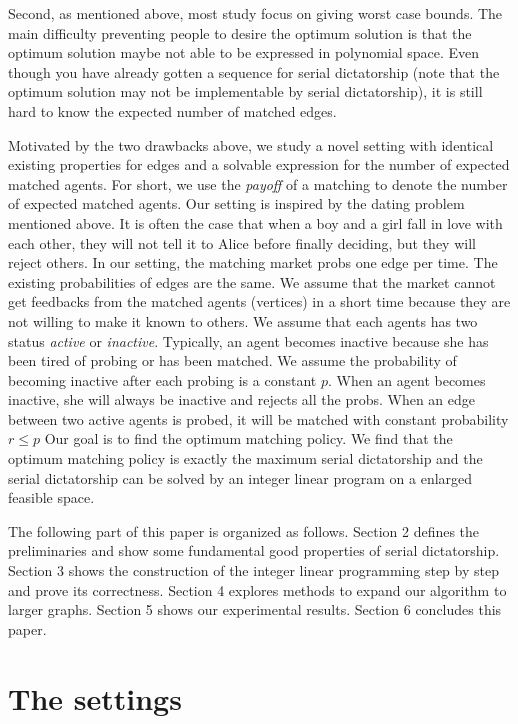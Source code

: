 \documentclass[letterpaper]{article}
\begin{document}
Second, as mentioned above, most study focus on giving worst case bounds. 
The main difficulty preventing people to desire the optimum solution is that the optimum solution maybe not able to be expressed in polynomial space.
Even though you have already gotten a sequence for serial dictatorship (note that the optimum solution may not be implementable by serial dictatorship), it is still hard to know the expected number of matched edges. 

Motivated by the two drawbacks above, we study a novel setting with identical existing properties for edges and a solvable expression for the number of expected matched agents.
For short, we use the \textit{payoff} of a matching to denote the number of expected matched agents.
Our setting is inspired by the dating problem mentioned above.
It is often the case that when a boy and a girl fall in love with each other, they will not tell it to Alice before finally deciding, but they will reject others.
In our setting, the matching market probs one edge per time.
The existing probabilities of edges are the same.
We assume that the market cannot get feedbacks from the matched agents (vertices) in a short time because they are not willing to make it known to others.
We assume that each agents has two status \textit{active} or \textit{inactive}.
Typically, an agent becomes inactive because she has been tired of probing or has been matched.
We assume the probability of becoming inactive after each probing is a constant $p$.
When an agent becomes inactive, she will always be inactive and rejects all the probs. 
When an edge between two active agents is probed, it will be matched with constant probability $r\leq p$
Our goal is to find the optimum matching policy.
We find that the optimum matching policy is exactly the maximum serial dictatorship and the serial dictatorship can be solved by an integer linear program on a enlarged feasible space.


The following part of this paper is organized as follows. Section 2 defines the preliminaries and show some fundamental good properties of serial dictatorship. Section 3 shows the construction of the integer linear programming step by step and prove its correctness. Section 4 explores methods to expand our algorithm to larger graphs. Section 5 shows our experimental results. Section 6 concludes this paper.


\section{The settings}
\end{document}
